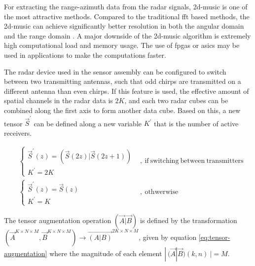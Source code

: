 For extracting the range-azimuth data from the radar signals,
\gls{2d-music} is one of the most attractive methods.
Compared to the traditional \gls{fft} based methods, the \gls{2d-music} can achieve significantly better resolution
in both the angular domain and the range domain \cite{2d-music-van-rossum}.
A major downside of the \gls{2d-music} algorithm is extremely high computational load and memory usage.
The use of \glspl{fpga} or \glspl{asic} may be used in applications to make the computations faster.

The radar device used in the sensor assembly can be configured to switch between two transmitting antennas,
such that odd chirps are transmitted on a different antenna than even chirps.
If this feature is used, the effective amount of spatial channels in the radar data is $2K$,
and each two radar cubes can be combined along the first axis to form another data cube.\cite{ti-iwr-user-guide}
Based on this, a new tensor $\vec{S}^\prime$ can be defined along a new variable $K^\prime$ that is the number of active receivers.

\begin{align}
    &\begin{cases}
        \vec{S}^{\prime}(z) = (\vec{S}(2z) | \vec{S}(2z+1)) \\
        K^\prime = 2K
    \end{cases}&,~\mathrm{if~switching~between~transmitters}
    \\
    &\begin{cases}
        \vec{S}^{\prime}(z) = \vec{S}(z) \\
        K^\prime = K
    \end{cases}&,~\mathrm{othwerwise}
\end{align}

The tensor augmentation operation $(\vec{A} | \vec{B})$ is defined by the transformation \\
$(\vec{A}^{K \times N \times M}, \vec{B}^{K \times N \times M}) \to \vec{(A|B)}^{2K \times N \times M}$, given by
equation \ref{eq:tensor-augmentation} where the magnitude of each element $|~(\vec{A}|\vec{B})(k, n)~| = M$.

